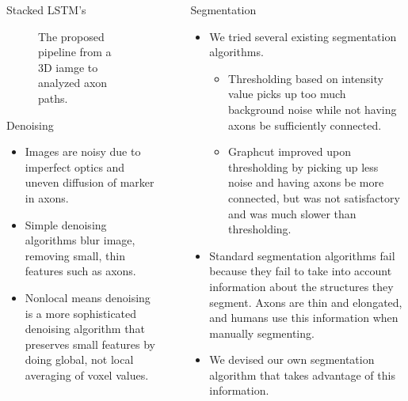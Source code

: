 \documentclass[final]{beamer}
\newlength{\colwidth}
\newlength{\columnseparation}
\begin{document}
\begin{frame}[t]
\begin{columns}[t]
\begin{column}{\colwidth}
\begin{block}{Stacked LSTM's}
\begin{figure}
\caption{The proposed pipeline from a 3D iamge to analyzed axon paths.}

\end{figure}

\end{block}

\begin{block}{Denoising}
\begin{itemize}
	\item Images are noisy due to imperfect optics and uneven diffusion of marker in axons.
	\item Simple denoising algorithms blur image, removing small, thin features such as axons.
	\item Nonlocal means denoising \cite{nonlocalmeans} is a more sophisticated denoising algorithm that preserves small features by doing global, not local averaging of voxel values.
\end{itemize}

\end{block}

\end{column} %

\begin{column}{\columnseparation}\end{column} %

\begin{column}{\colwidth} %

\begin{block}{Segmentation}

\begin{itemize}
	\item We tried several existing segmentation algorithms.
	\begin{itemize}	
		\item Thresholding based on intensity value picks up too much background noise while not having axons be sufficiently connected.
		\item Graphcut \cite{graphcut} improved upon thresholding by picking up less noise and having axons be more connected, but was not satisfactory and was much slower than thresholding.
	\end{itemize}
	\item Standard segmentation algorithms fail because they fail to take into account information about the structures they segment. Axons are thin and elongated, and humans use this information when manually segmenting.
	\item We devised our own segmentation algorithm that takes advantage of this information.
\end{itemize}


\end{block}
\end{column}
\end{columns}
\end{frame}
\end{document}
